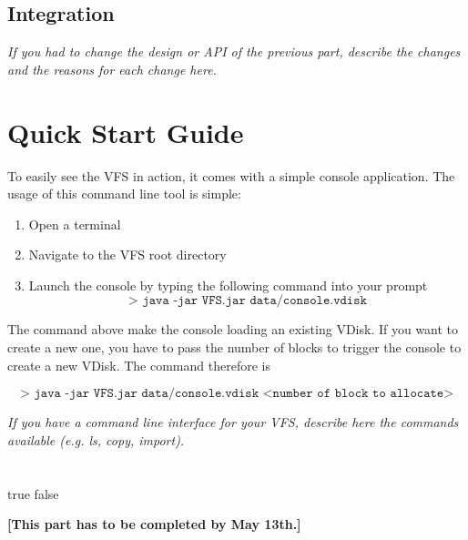 \documentclass[a4paper,12pt]{article}
\begin{document}
\subsection{Integration}

\emph{If you had to change the design or API of the previous part, describe the changes and the reasons for each change here.}

\fi


\section{Quick Start Guide}

To easily see the VFS in action, it comes with a simple console application. The usage of this command line tool is simple:

\begin{enumerate}
\item Open a terminal
\item Navigate to the VFS root directory
\item Launch the console by typing the following command into your prompt
\[\texttt{> java -jar VFS.jar data/console.vdisk} \]
\end{enumerate}

The command above make the console loading an existing VDisk. If you want to create a new one, you have to pass the number of blocks to trigger the console to create a new VDisk. The command therefore is

\[\texttt{> java -jar VFS.jar data/console.vdisk <number of block to allocate>}\]



\emph{If you have a command line interface for your VFS, describe here the commands available (e.g. ls, copy, import).} \\ \\ \\

\ifx true false

\noindent\textbf{[This part has to be completed by May 13th.]}
\end{document}
